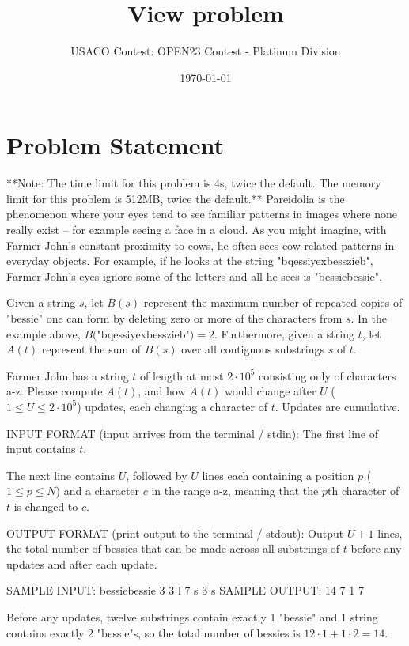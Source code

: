 \documentclass[12pt]{article}
\title{View problem}
\author{USACO Contest: OPEN23 Contest - Platinum Division}
\date{\today}
\begin{document}
\maketitle

\section*{Problem Statement}


**Note: The time limit for this problem is 4s, twice the default. The memory
limit for this problem is 512MB, twice the default.**
Pareidolia is the phenomenon where your eyes tend to see familiar patterns in
images where none really exist -- for example seeing a face in a cloud.  As you
might imagine, with Farmer John's constant proximity to cows, he often sees
cow-related patterns in everyday objects.  For example, if he looks at the
string "bqessiyexbesszieb", Farmer John's  eyes ignore some of the letters and
all he sees is "bessiebessie".  

Given a string $s$, let $B(s)$ represent the maximum number of repeated copies
of  "bessie" one can form by deleting zero or more of the characters from $s$. 
In the example above, $B($"bqessiyexbesszieb"$) = 2$.  Furthermore, given a 
string $t$, let $A(t)$ represent the sum of $B(s)$ over all contiguous 
substrings $s$ of $t$.

Farmer John has a string $t$ of length at most $2\cdot 10^5$ consisting only of
characters a-z.  Please compute $A(t)$, and how $A(t)$ would change after $U$
($1\le U\le 2\cdot 10^5$) updates, each changing a character of $t$.  Updates
are cumulative.

INPUT FORMAT (input arrives from the terminal / stdin):
The first line of input contains $t$.

The next line contains $U$, followed by $U$ lines each containing a position $p$
($1\le p\le N$) and a character $c$ in the range a-z, meaning that the $p$th
character of $t$ is changed to $c$.

OUTPUT FORMAT (print output to the terminal / stdout):
Output $U+1$ lines, the total number of bessies that can be made across all
substrings of $t$ before any updates and after each update.

SAMPLE INPUT:
bessiebessie
3
3 l
7 s
3 s
SAMPLE OUTPUT: 
14
7
1
7

Before any updates, twelve substrings contain exactly 1 "bessie" and 1 string
contains exactly 2 "bessie"s, so the total number of bessies is
$12\cdot 1 + 1 \cdot 2 = 14$.
\end{document}
